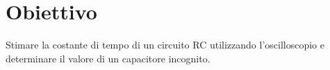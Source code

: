 \section{Obiettivo}

Stimare la costante di tempo di un circuito RC utilizzando l'oscilloscopio e determinare il valore di un capacitore incognito.\\
